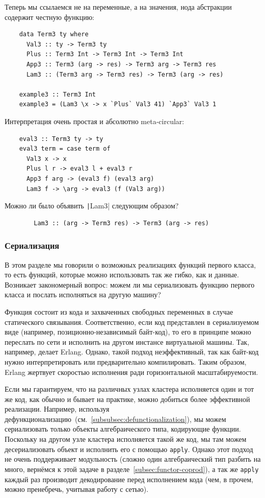 Теперь мы ссылаемся не на переменные, а на значения, нода абстракции содержит честную функцию:
\begin{verbatim}
    data Term3 ty where
      Val3 :: ty -> Term3 ty
      Plus :: Term3 Int -> Term3 Int -> Term3 Int
      App3 :: Term3 (arg -> res) -> Term3 arg -> Term3 res
      Lam3 :: (Term3 arg -> Term3 res) -> Term3 (arg -> res)

    example3 :: Term3 Int
    example3 = (Lam3 \x -> x `Plus` Val3 41) `App3` Val3 1
\end{verbatim}

Интерпретация очень простая и абсолютно meta-circular:
\begin{verbatim}
    eval3 :: Term3 ty -> ty
    eval3 term = case term of
      Val3 x -> x
      Plus l r -> eval3 l + eval3 r
      App3 f arg -> (eval3 f) (eval3 arg)
      Lam3 f -> \arg -> eval3 (f (Val3 arg))
\end{verbatim}

\begin{task}
    Можно ли было объявить \texttt|Lam3| следующим образом?
    \begin{verbatim}
        Lam3 :: (arg -> Term3 res) -> Term3 (arg -> res)
    \end{verbatim}
\end{task}

\subsubsection{Сериализация}

В этом разделе мы говорили о возможных реализациях функций первого класса, то есть функций, которые можно использовать так же гибко, как и данные.
Возникает закономерный вопрос: можем ли мы сериализовать функцию первого класса и послать исполняться на другую машину?

Функция состоит из кода и захваченных свободных переменных в случае статического связывания.
Соответственно, если код представлен в сериализуемом виде (например, позиционно-независимый байт-код), то его в принципе можно переслать по сети и исполнить на другом инстансе виртуальной машины.
Так, например, делает Erlang.
Однако, такой подход неэффективный, так как байт-код нужно интерпретировать или предварительно компилировать.
Таким образом, Erlang жертвует скоростью исполнения ради горизонтальной масштабируемости.

Если мы гарантируем, что на различных узлах кластера исполняется один и тот же код, как обычно и бывает на практике, можно добиться более эффективной реализации.
Например, используя дефункционализацию~(см.~\ref{subsubsec:defunctionalization}), мы можем сериализовать только объекты алгебраического типа, кодирующие функции.
Поскольку на другом узле кластера исполняется такой же код, мы там можем десериализовать объект и исполнить его с помощью \texttt{apply}.
Однако этот подход не очень поддерживает модульность (сложно один алгебраический тип разбить на много, вернёмся к этой задаче в разделе~\ref{subsec:functor-coprod}), а так же \texttt{apply} каждый раз производит декодирование перед исполнением кода (чем, в прочем, можно пренебречь, учитывая работу с сетью).

